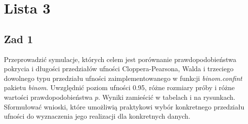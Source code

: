 \documentclass[12pt]{mwart}\usepackage[]{graphicx}\usepackage[]{color}
\begin{document}
\section*{Lista 3}
\subsection*{Zad 1}
Przeprowadzić symulacje, których celem jest porównanie prawdopodobieństwa pokrycia i długości przedziałów ufności Cloppera-Pearsona, Walda i trzeciego dowolnego typu przedziału ufności zaimplementowanego w funkcji \textit{binom.confint} pakietu \textit{binom}. Uwzględnić poziom ufności 0.95, różne rozmiary próby i różne wartości prawdopodobieństwa $p$. Wyniki zamieścić w tabelach i na rysunkach. Sformułować wnioski, które umożliwią praktykowi wybór konkretnego przedziału ufności do wyznaczenia jego realizacji dla konkretnych danych.\\
\end{document}
